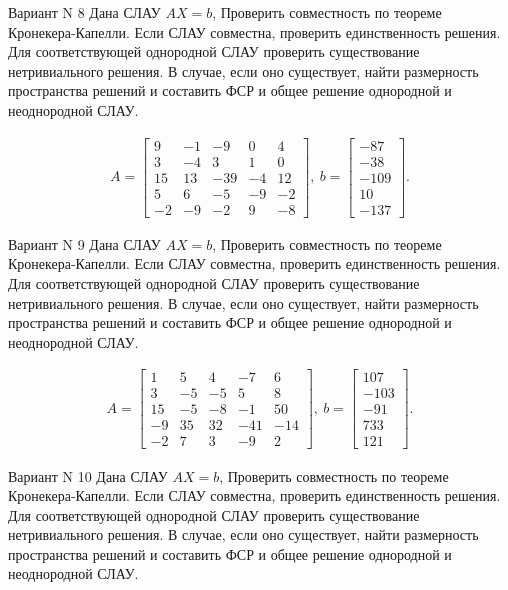 \documentclass[11pt]{report}
\begin{document}
Вариант N 8
Дана СЛАУ $AX = b$,
Проверить совместность по теореме Кронекера-Капелли. Если СЛАУ совместна, проверить единственность решения.
Для соответствующей однородной СЛАУ проверить существование нетривиального решения. В случае, если оно существует,
найти размерность пространства решений и составить ФСР и общее решение однородной  и неоднородной СЛАУ.


\begin{align*}
 A = \left[\begin{matrix}9 & -1 & -9 & 0 & 4\\3 & -4 & 3 & 1 & 0\\15 & 13 & -39 & -4 & 12\\5 & 6 & -5 & -9 & -2\\-2 & -9 & -2 & 9 & -8\end{matrix}\right],
\ b = \left[\begin{matrix}-87\\-38\\-109\\10\\-137\end{matrix}\right]. 
 \end{align*}

Вариант N 9
Дана СЛАУ $AX = b$,
Проверить совместность по теореме Кронекера-Капелли. Если СЛАУ совместна, проверить единственность решения.
Для соответствующей однородной СЛАУ проверить существование нетривиального решения. В случае, если оно существует,
найти размерность пространства решений и составить ФСР и общее решение однородной  и неоднородной СЛАУ.


\begin{align*}
 A = \left[\begin{matrix}1 & 5 & 4 & -7 & 6\\3 & -5 & -5 & 5 & 8\\15 & -5 & -8 & -1 & 50\\-9 & 35 & 32 & -41 & -14\\-2 & 7 & 3 & -9 & 2\end{matrix}\right],
\ b = \left[\begin{matrix}107\\-103\\-91\\733\\121\end{matrix}\right]. 
 \end{align*}

Вариант N 10
Дана СЛАУ $AX = b$,
Проверить совместность по теореме Кронекера-Капелли. Если СЛАУ совместна, проверить единственность решения.
Для соответствующей однородной СЛАУ проверить существование нетривиального решения. В случае, если оно существует,
найти размерность пространства решений и составить ФСР и общее решение однородной  и неоднородной СЛАУ.
\end{document}
